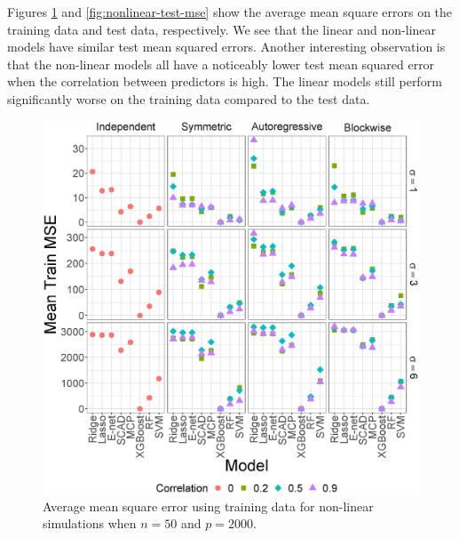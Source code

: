 \documentclass{article}
\begin{document}
	Figures \ref{fig:nonlinear-train-mse} and \ref{fig:nonlinear-test-mse} show the average mean square errors on the training data and test data, respectively. We see that the linear and non-linear models have similar test mean squared errors. Another interesting observation is that the non-linear models all have a noticeably lower test mean squared error when the correlation between predictors is high. The linear models still perform significantly worse on the training data compared to the test data. 
	\begin{figure}[h!]
		\centering
		\begin{minipage}[t]{0.47\textwidth}
			\includegraphics[width = \textwidth]{images/facet/publication_facet_train_mse_2_50_2000.eps}
			\captionsetup{width = 0.95\textwidth}
			\caption{Average mean square error using training data for non-linear simulations when $n = 50$ and $p = 	2000$.}
			\label{fig:nonlinear-train-mse}
		\end{minipage}
		\hspace{6pt}
		\begin{minipage}[t]{0.47\textwidth}

\end{minipage}
\end{figure}
\end{document}

